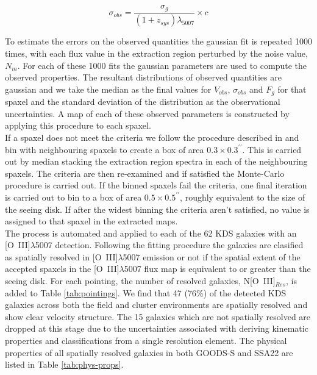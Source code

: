 \documentclass[fleqn,usenatbib]{mn2e}
\begin{document}
\begin{equation}\label{eq:dispersion_comp}
   \sigma_{obs} = \frac{\sigma_{g}}{(1 + z_{sys})\lambda_{5007}} \times c
\end{equation}

To estimate the errors on the observed quantities the gaussian fit is repeated 1000 times, with each flux value in the extraction region perturbed by the noise value, $N_{m}$.
For each of these 1000 fits the gaussian parameters are used to compute the observed properties.
The resultant distributions of observed quantities are gaussian and we take the median as the final values for $V_{obs}$, $\sigma_{obs}$ and $F_{g}$ for that spaxel and the standard deviation of the distribution as the observational uncertainties.
A map of each of these observed parameters is constructed by applying this procedure to each spaxel. \\

If a spaxel does not meet the criteria we follow the procedure described in \cite{Stott2016} and bin with neighbouring spaxels to create a box of area $0.3\times0.3^{\prime\prime}$.
This is carried out by median stacking the extraction region spectra in each of the neighbouring spaxels.
The criteria are then re-examined and if satisfied the Monte-Carlo procedure is carried out. 
If the binned spaxels fail the criteria, one final iteration is carried out to bin to a box of area $0.5\times0.5^{\prime\prime}$, roughly equivalent to the size of the seeing disk.
If after the widest binning the criteria aren't satisfied, no value is assigned to that spaxel in the extracted maps. \\

The process is automated and applied to each of the 62 KDS galaxies with an [O~{\sc III}]$\lambda$5007 detection.
Following the fitting procedure the galaxies are clasified as spatially resolved in [O~{\sc III}]$\lambda$5007 emission or not if the spatial extent of the accepted spaxels in the [O~{\sc III}]$\lambda$5007 flux map is equivalent to or greater than the seeing disk.
For each pointing, the number of resolved galaxies, N[O~{\sc III}]$_{Res}$, is added to Table \ref{tab:pointings}.
We find that 47 (76\%) of the detected KDS galaxies across both the field and cluster environments are spatially resolved and show clear velocity structure.
The 15 galaxies which are not spatially resolved are dropped at this stage due to the uncertainties associated with deriving kinematic properties and classifications from a single resolution element.
The physical properties of all spatially resolved galaxies in both GOODS-S and SSA22 are listed in Table \ref{tab:phys-props}. \\ 
\end{document}
